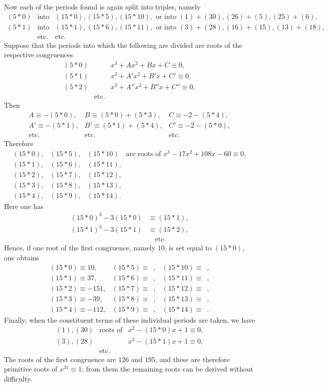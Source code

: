 \documentclass[12pt]{article}
\begin{document}
Now each of the periods found is again split into triples, namely
\[
\begin{array}{rcl}
(5*0)&\text{into}&(15*0),(15*5),(15*10),\text{ or into }(1)+(30),(26)+(5),(25)+(6),\\
(5*1)&\text{into}&(15*1),(15*6),(15*11),\text{ or into }(3)+(28),(16)+(15),(13)+(18),\\
&\text{etc.}&\text{etc.}
\end{array}
\]
Suppose that the periods into which the following are divided are roots of the respective congruences
\[
\begin{array}{rcl}
(5*0)&&x^3+A x^2+B x+C\equiv 0,\\
(5*1)&&x^3+A'x^2+B'x+C'\equiv 0,\\
(5*2)&&x^3+A''x^2+B''x+C''\equiv 0,\\
&\text{etc.}&
\end{array}
\]
Then
\[
\begin{array}{lll}
A\equiv -(5*0),&B\equiv (5*0)+(5*3),&C\equiv -2-(5*4),\\
A'\equiv -(5*1),&B'\equiv (5*1)+(5*4),&C'\equiv -2-(5*0),\\
\text{etc.}&\text{etc.}&\text{etc.}
\end{array}
\]
Therefore
\[
\begin{array}{lll}
(15*0),&(15*5),&(15*10)\quad\text{are roots of }x^3-17x^2+108x-60\equiv 0,\\
(15*1),&(15*6),&(15*11),\\
(15*2),&(15*7),&(15*12),\\
(15*3),&(15*8),&(15*13),\\
(15*4),&(15*9),&(15*14).
\end{array}
\]
Here one has
\[
\begin{aligned}
(15*0)^3-3(15*0)&\equiv (15*1),\\
(15*1)^3-3(15*1)&\equiv (15*2),\\
&\quad\text{etc.}
\end{aligned}
\]
Hence, if one root of the first congruence, namely $10$, is set equal to $(15*0)$, one obtains
\[
\begin{array}{lll}
(15*0)\equiv 10,&(15*5)\equiv \phantom{0},&(15*10)\equiv \phantom{0},\\
(15*1)\equiv 37,&(15*6)\equiv \phantom{0},&(15*11)\equiv \phantom{0},\\
(15*2)\equiv -151,&(15*7)\equiv \phantom{0},&(15*12)\equiv \phantom{0},\\
(15*3)\equiv -39,&(15*8)\equiv \phantom{0},&(15*13)\equiv \phantom{0},\\
(15*4)\equiv -112,&(15*9)\equiv \phantom{0},&(15*14)\equiv \phantom{0}.
\end{array}
\]
Finally, when the constituent terms of these individual periods are taken, we have
\[
\begin{array}{rcl}
(1),(30)&\text{roots of}&x^2-(15*0)x+1\equiv 0,\\
(3),(28)&&x^2-(15*1)x+1\equiv 0,\\
&\text{etc.}&
\end{array}
\]
The roots of the first congruence are $126$ and $195$, and these are therefore primitive roots of $x^{31}\equiv 1$; from them the remaining roots can be derived without difficulty.
\end{document}
